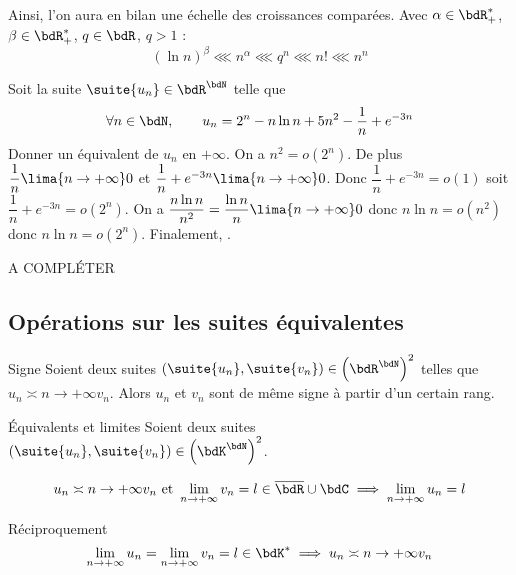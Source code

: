 \documentclass[a4paper,french,bookmarks]{article}
\begin{document}
Ainsi, l'on aura en bilan une échelle des croissances comparées. Avec $\alpha \in \bdR_+^*$, $\beta \in \bdR_+^*$, $q \in \bdR$, $q > 1$ :
\[ \left(\ln n\right)^\beta \lll n^\alpha \lll q^n \lll n! \lll n^n\]

\begin{example}{}{}
    Soit la suite $\suite{u_n} \in \bdR^\bdN$ telle que 
    \[ \forall n \in \bdN, \qquad u_n = 2^n - n\ln n + 5n^2 - \dfrac{1}{n}+e^{-3n}\]
    Donner un équivalent de $u_n$ en $+\infty$.
    \tcblower
    On a $n^2 = o(2^n)$. De plus $\dfrac{1}{n} \lima{n \to +\infty} 0$ et $\dfrac{1}{n}+e^{-3n} \lima{n \to +\infty} 0$. Donc $\dfrac{1}{n}+e^{-3n} = o(1)$ soit $\dfrac{1}{n}+e^{-3n} = o(2^n)$.
    On a $\dfrac{n\ln n}{n^2} = \dfrac{\ln n}{n} \lima{n \to +\infty} 0$ donc $n\ln{n}=o(n^2)$ donc $n\ln{n}=o(2^n)$. Finalement, .
\end{example}

A COMPLÉTER

\subsection{Opérations sur les suites équivalentes}

\begin{property}{Signe}{}
    Soient deux suites $(\suite{u_n}, \suite{v_n}) \in \left(\bdR^\bdN\right)^2$ telles que $u_n \asymp{n \to +\infty} v_n$. 
    Alors $u_n$ et $v_n$ sont de même signe à partir d'un certain rang.
\end{property}


\begin{property}{Équivalents et limites}{}
    Soient deux suites $(\suite{u_n}, \suite{v_n}) \in \left(\bdK^\bdN\right)^2$.
    
    \[ u_n \asymp{n \to +\infty} v_n \ \text{et} \ \lim\limits_{n \to +\infty} v_n = l \in \overline{\bdR} \cup \bdC \implies \lim\limits_{n \to +\infty} u_n = l\]
    
    Réciproquement 
    \[\lim\limits_{n \to +\infty} u_n = \lim\limits_{n \to +\infty} v_n = l \in \bdK^* \implies u_n \asymp{n \to +\infty} v_n \]
\end{property}

\end{document}
